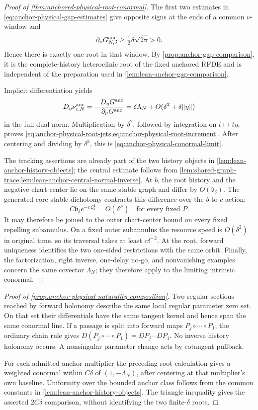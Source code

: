 \begin{proof}[Proof of \cref{thm:anchored-physical-root-conormal}]
The first two estimates in \cref{eq:anchor-physical-gap-estimates} give
opposite signs at the ends of a common \(\nu\)-window and
\[
 \partial_\nu G^{\rm anc}_{N,\delta}
 \ge\tfrac12\delta\sqrt{2\pi}>0.
\]
Hence there is exactly one root in that window.  By
\cref{prop:anchor-gap-comparison}, it is the complete-history heteroclinic
root of the fixed anchored RFDE and is independent of the preparation used
in \cref{lem:lean-anchor-gap-comparison}.

Implicit differentiation yields
\[
 D_\eta\nu^{\rm anc}_{c,N}
 =-\frac{D_\eta G^{\rm anc}}{\partial_\nu G^{\rm anc}}
 =\delta\Lambda_N+O(\delta^2+\delta\|\eta\|)
\]
in the full dual norm.  Multiplication by \(\delta^2\), followed by
integration on \(t\mapsto t\eta\), proves
\cref{eq:anchor-physical-root-jets,eq:anchor-physical-root-increment}.
After centering and dividing by \(\delta^3\), this is
\cref{eq:anchor-physical-conormal-limit}.

The tracking assertions are already part of the two history objects in
\cref{lem:lean-anchor-history-objects}; the central estimate follows from
\cref{lem:shared-graph-trace,lem:lean-anchor-central-normal-inverse}.
At \(b\), the root history and the negative chart center lie on the same
stable graph and differ by \(O(\mathfrak b_\delta)\).  The generated-core
stable dichotomy contracts this difference over the \(b\)-to-\(c\) action:
\[
 C\mathfrak b_\delta e^{-c\mathscr L_\delta^2}=O(\delta^P)
 \quad\text{for every fixed }P.
\]
It may therefore be joined to the outer chart-center bound on every fixed
repelling subannulus.  On a fixed outer subannulus the
resource speed is \(O(\delta^2)\) in original time, so its traversal takes
at least \(c\delta^{-2}\).  At the root, forward uniqueness identifies the
two one-sided restrictions with the same orbit.  Finally, the factorization,
right inverse, one-delay no-go, and nonvanishing examples concern the same
covector \(\Lambda_N\); they therefore apply to the limiting intrinsic
conormal.
\end{proof}

\begin{proof}[Proof of
  \cref{prop:anchor-physical-naturality-composition}]
Two regular sections reached by forward holonomy describe the same local
regular parameter zero set.  On that set their differentials have the same
tangent kernel and hence span the same conormal line.  If a passage is split
into forward maps
\(P_j\circ\cdots\circ P_1\), the ordinary chain rule gives
\(D(P_j\circ\cdots\circ P_1)=DP_j\cdots DP_1\).  No inverse history
holonomy occurs.  A nonsingular parameter change acts by cotangent pullback.

For each admitted anchor multiplier the preceding root calculation gives a
weighted conormal within \(C\delta\) of \((1,-\Lambda_N)\), after centering
at that multiplier's own baseline.  Uniformity over the bounded anchor
class follows from the common constants in
\cref{lem:lean-anchor-history-objects}.  The triangle
inequality gives the asserted \(2C\delta\) comparison, without identifying
the two finite-\(\delta\) roots.
\end{proof}
